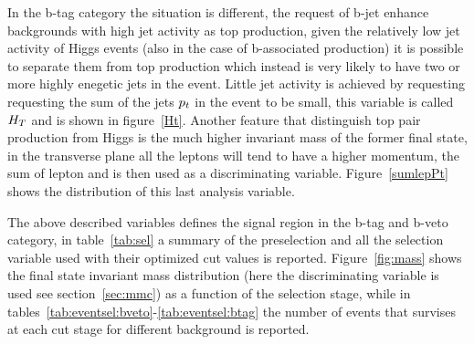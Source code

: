 In the b-tag category the situation is different, 
the  request of b-jet enhance backgrounds with high jet activity as top production, given the relatively low
jet activity of Higgs events (also in the case of b-associated production) it is possible to separate them from
top production which instead is very likely to have two or more highly enegetic jets in the event.
Little jet activity is achieved by requesting requesting the sum of the jets $p_{t}$ in the event to be small, this variable is called $H_{T}$
and is shown in figure~\ref{Ht}.
Another feature that distinguish top pair production from Higgs is the much higher invariant mass of the former final state,
in the transverse plane all the leptons will tend to have a higher momentum, the sum of lepton \pt and \met is then used as
a discriminating variable. Figure~\ref{sumlepPt} shows the distribution of this last analysis variable.

The above described variables defines the signal region in the b-tag and b-veto category,
in table~\ref{tab:sel} a summary of the preselection and all the selection variable used with their optimized cut values is reported.
Figure~\ref{fig:mass} shows the final state invariant mass distribution (here the \mmc 
discriminating variable is used see section~\ref{sec:mmc}) as a function of the selection stage,
while in tables~\ref{tab:eventsel:bveto}-\ref{tab:eventsel:btag} the number of events that survises at each cut stage for different background is reported.

